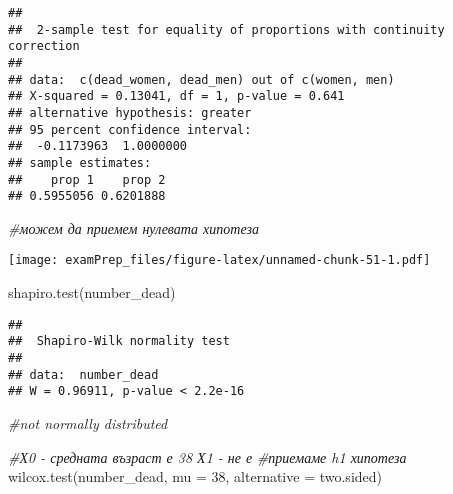 \documentclass[
]{article}
\newenvironment{Shaded}{\begin{snugshade}}{\end{snugshade}}
\newcommand{\AttributeTok}[1]{\textcolor[rgb]{0.77,0.63,0.00}{#1}}
\newcommand{\CommentTok}[1]{\textcolor[rgb]{0.56,0.35,0.01}{\textit{#1}}}
\newcommand{\DecValTok}[1]{\textcolor[rgb]{0.00,0.00,0.81}{#1}}
\newcommand{\FunctionTok}[1]{\textcolor[rgb]{0.00,0.00,0.00}{#1}}
\newcommand{\NormalTok}[1]{#1}
\newcommand{\OtherTok}[1]{\textcolor[rgb]{0.56,0.35,0.01}{#1}}
\newcommand{\SpecialCharTok}[1]{\textcolor[rgb]{0.00,0.00,0.00}{#1}}
\newcommand{\StringTok}[1]{\textcolor[rgb]{0.31,0.60,0.02}{#1}}
\begin{document}
\begin{verbatim}
## 
##  2-sample test for equality of proportions with continuity correction
## 
## data:  c(dead_women, dead_men) out of c(women, men)
## X-squared = 0.13041, df = 1, p-value = 0.641
## alternative hypothesis: greater
## 95 percent confidence interval:
##  -0.1173963  1.0000000
## sample estimates:
##    prop 1    prop 2 
## 0.5955056 0.6201888
\end{verbatim}

\begin{Shaded}
\begin{Highlighting}[]
\CommentTok{\#можем да приемем нулевата хипотеза}
\end{Highlighting}
\end{Shaded}

\begin{Shaded}
\end{Shaded}

\texttt{[image: examPrep\_files/figure-latex/unnamed-chunk-51-1.pdf]}

\begin{Shaded}
\begin{Highlighting}[]
\FunctionTok{shapiro.test}\NormalTok{(number\_dead)}
\end{Highlighting}
\end{Shaded}

\begin{verbatim}
## 
##  Shapiro-Wilk normality test
## 
## data:  number_dead
## W = 0.96911, p-value < 2.2e-16
\end{verbatim}

\begin{Shaded}
\begin{Highlighting}[]
\CommentTok{\#not normally distributed}

\CommentTok{\#Х0 {-} средната възраст е 38 Х1 {-} не е }
\CommentTok{\#приемаме h1 хипотеза}
\FunctionTok{wilcox.test}\NormalTok{(number\_dead, }\AttributeTok{mu =} \DecValTok{38}\NormalTok{, }\AttributeTok{alternative =} \StringTok{\textquotesingle{}two.sided\textquotesingle{}}\NormalTok{)}
\end{Highlighting}
\end{Shaded}
\end{document}
